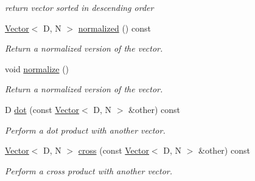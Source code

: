 \begin{DoxyCompactItemize}
\begin{DoxyCompactList}\small\item\em return vector sorted in descending order \end{DoxyCompactList}\item 
\mbox{\label{classrev_1_1_vector_ab76b0f9723b62a39522a0a1691aa209e}} 
\mbox{\hyperlink{classrev_1_1_vector}{Vector}}$<$ D, N $>$ \mbox{\hyperlink{classrev_1_1_vector_ab76b0f9723b62a39522a0a1691aa209e}{normalized}} () const
\begin{DoxyCompactList}\small\item\em Return a normalized version of the vector. \end{DoxyCompactList}\item 
\mbox{\label{classrev_1_1_vector_a042df9ad2ad1fff64c7494ad252e66d3}} 
void \mbox{\hyperlink{classrev_1_1_vector_a042df9ad2ad1fff64c7494ad252e66d3}{normalize}} ()
\begin{DoxyCompactList}\small\item\em Return a normalized version of the vector. \end{DoxyCompactList}\item 
\mbox{\label{classrev_1_1_vector_af7ccc9bd571b573d088f886259da24f5}} 
D \mbox{\hyperlink{classrev_1_1_vector_af7ccc9bd571b573d088f886259da24f5}{dot}} (const \mbox{\hyperlink{classrev_1_1_vector}{Vector}}$<$ D, N $>$ \&other) const
\begin{DoxyCompactList}\small\item\em Perform a dot product with another vector. \end{DoxyCompactList}\item 
\mbox{\label{classrev_1_1_vector_a6dd91974b1e91e785001757c87b362e8}} 
\mbox{\hyperlink{classrev_1_1_vector}{Vector}}$<$ D, N $>$ \mbox{\hyperlink{classrev_1_1_vector_a6dd91974b1e91e785001757c87b362e8}{cross}} (const \mbox{\hyperlink{classrev_1_1_vector}{Vector}}$<$ D, N $>$ \&other) const
\begin{DoxyCompactList}\small\item\em Perform a cross product with another vector. \end{DoxyCompactList}\item 
\mbox{\label{classrev_1_1_vector_a48fbca38fa246e549e889aeed4dab8a2}} 

\end{DoxyCompactItemize}
